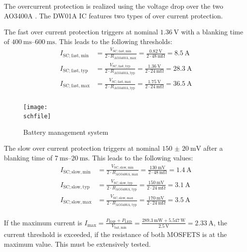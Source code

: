 The overcurrent protection is realized using the voltage drop over the two AO3400A \cite{AOSMD:AO3400A}. The DW01A IC features two types of over current protection. 

The fast over current protection triggers at nominal $\SI{1.36}{\V}$ with a blanking time of $\qtyrange{400}{600}{\ms}$. This leads to the following thresholds: 
\begin{align}
	I_\mathrm{SC;fast,min} &= \frac{V_\mathrm{SC,fast,min}}{2\cdot R_\mathrm{AO3400A,max}}=\frac{\SI{0.82}{\V}}{2\cdot\SI{48}{\milli\ohm}}=\SI{8.5}{\A}\\
		I_\mathrm{SC;fast,typ} &= \frac{V_\mathrm{SC,fast,typ}}{2\cdot R_\mathrm{AO3400A,typ}}=\frac{\SI{1.36}{\V}}{2\cdot\SI{24}{\milli\ohm}}=\SI{28.3}{\A}\\
		I_\mathrm{SC;fast,max} &= \frac{V_\mathrm{SC,fast,max}}{2\cdot R_\mathrm{AO3400A,typ}}=\frac{\SI{1.75}{\V}}{2\cdot\SI{24}{\milli\ohm}}=\SI{36.5}{\A}\\
\end{align}


\begin{figure}[h!]
    \centering
    \texttt{[image: \\schfile]}
    \caption{Battery management system}
    \label{fig_bms}
\end{figure}

The slow over current protection triggers at nominal $\SI[separate-uncertainty=true,multi-part-units=single]{150(20)}{\milli\V}$ after a blanking time of $\qtyrange{7}{20}{\ms}$. This leads to the following values: 
\begin{align}
	I_\mathrm{SC;slow,min} &= \frac{V_\mathrm{SC,slow,min}}{2\cdot R_\mathrm{AO3400A,max}}=\frac{\SI{130}{\milli\V}}{2\cdot\SI{48}{\milli\ohm}}=\SI{1.4}{\A}\\
		I_\mathrm{SC;slow,typ} &= \frac{V_\mathrm{SC,slow,typ}}{2\cdot R_\mathrm{AO3400A,typ}}=\frac{\SI{150}{\milli\V}}{2\cdot\SI{24}{\milli\ohm}}=\SI{3.1}{\A}\\
		I_\mathrm{SC;slow,max} &= \frac{V_\mathrm{SC,slow,max}}{2\cdot R_\mathrm{AO3400A,typ}}=\frac{\SI{170}{\milli\V}}{2\cdot\SI{24}{\milli\ohm}}=\SI{3.5}{\A}\\
\end{align}

If the maximum current is $I_\mathrm{max}=\frac{P_\mathrm{ESP}+P_\mathrm{LED}}{V_\mathrm{bat,min}}=\frac{\SI{289.3}{\milli\W} + \SI{5.547}{\W}}{\SI{2.5}{\V}}=\SI{2.33}{\A}$, the current threshold is exceeded, if the resistance of both MOSFETS is at the maximum value. This must be extensively tested. 

